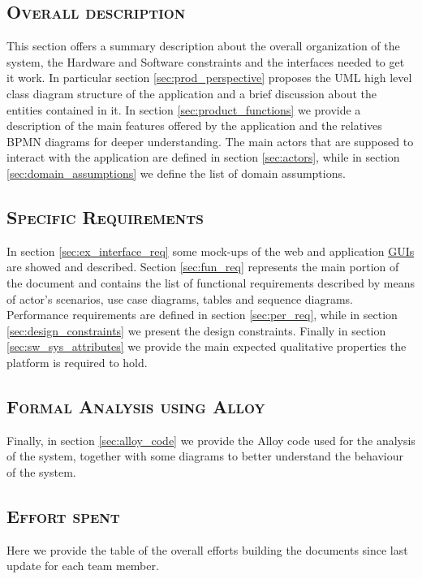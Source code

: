 \subsection*{\textsc{\textcolor{myblue}{ Overall description}}}
This section offers a summary description about the overall organization of the system, the Hardware and Software constraints and the interfaces needed to get it work. In particular section \ref{sec:prod_perspective} proposes the UML high level class diagram structure of the application and a brief discussion about the entities contained in it. In section \ref{sec:product_functions} we provide a description of the main features offered by the application and the relatives BPMN diagrams for deeper understanding. The main actors that are supposed to interact with the application are defined in section \ref{sec:actors}, while in section \ref{sec:domain_assumptions} we define the list of domain assumptions.
\subsection*{\textsc{\textcolor{myblue}{ Specific Requirements}}}
In section \ref{sec:ex_interface_req} some mock-ups of the web and application \hyperref[tab:acronymsTable]{GUIs} are showed and described. Section \ref{sec:fun_req} represents the main portion of the document and contains the list of functional requirements described by means of actor's scenarios, use case diagrams, tables and sequence diagrams. Performance requirements are defined in section \ref{sec:per_req}, while in section \ref{sec:design_constraints} we present the design constraints. Finally in section \ref{sec:sw_sys_attributes} we provide the main expected qualitative properties the platform is required to hold.
\subsection*{\textsc{\textcolor{myblue}{ Formal Analysis using Alloy}}}
Finally, in section \ref{sec:alloy_code} we provide the Alloy code used for the analysis of the system, together with some diagrams to better understand the behaviour of the system.

\subsection*{\textsc{\textcolor{myblue}{ Effort spent}}}
Here we provide the table of the overall efforts building the documents since last update for each team member.
